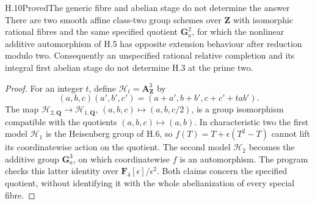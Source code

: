 \begin{statement}{H.10}{Proved}{The generic fibre and abelian stage do not determine the answer}
There are two smooth affine class-two group schemes over $\mathbf Z$
with isomorphic rational fibres and the same specified quotient
$\mathbf G_a^2$, for which the nonlinear additive automorphism of
H.5 has opposite extension behaviour after reduction modulo two.
Consequently an unspecified rational relative completion and its
integral first abelian stage do not determine H.3 at the prime two.
\end{statement}
\begin{proof}
For an integer $t$, define $\mathscr H_t=\mathbf A^3_{\mathbf Z}$ by
\[
 (a,b,c)(a',b',c')=(a+a',b+b',c+c'+t ab').
\]
The map $\mathscr H_{2,\mathbf Q}\to\mathscr H_{1,\mathbf Q}$,
$(a,b,c)\mapsto(a,b,c/2)$, is a group isomorphism compatible with
the quotients $(a,b,c)\mapsto(a,b)$. In characteristic two the
first model $\mathscr H_1$ is the Heisenberg group of H.6, so
$f(T)=T+\epsilon(T^2-T)$ cannot lift its coordinatewise action on
the quotient. The second model $\mathscr H_2$ becomes the additive
group $\mathbf G_a^3$, on which coordinatewise $f$ is an
automorphism. The program checks this latter identity over
$\mathbf F_4[\epsilon]/\epsilon^2$. Both claims concern the
specified quotient, without identifying it with the whole
abelianization of every special fibre.
\end{proof}

